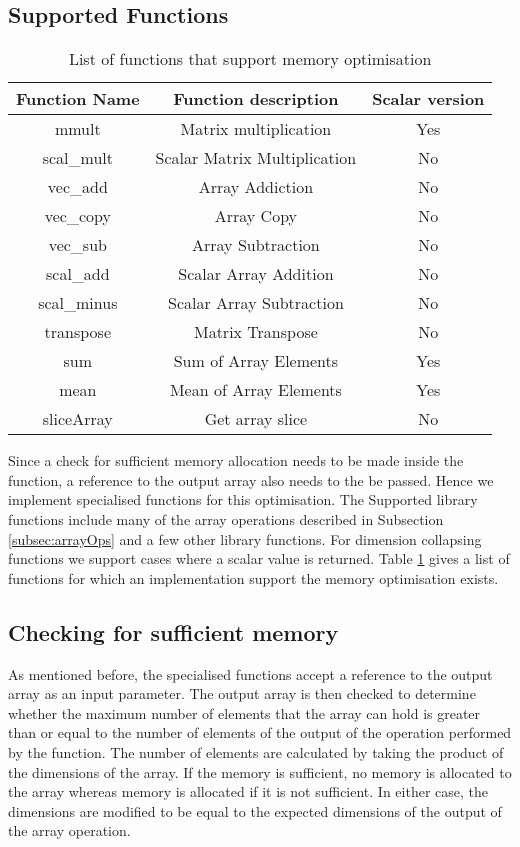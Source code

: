 \subsection{Supported Functions}
\begin{table}[htbp]
\centering
\begin{tabular}{|c|c|c|}
\hline
Function Name & Function description         & Scalar version \\ \hline
mmult         & Matrix multiplication        & Yes            \\ \hline
scal\_mult    & Scalar Matrix Multiplication & No             \\ \hline
vec\_add      & Array Addiction              & No             \\ \hline
vec\_copy     & Array Copy                   & No             \\ \hline
vec\_sub      & Array Subtraction            & No             \\ \hline
scal\_add     & Scalar Array Addition        & No             \\ \hline
scal\_minus   & Scalar Array Subtraction     & No             \\ \hline
transpose     & Matrix Transpose             & No             \\ \hline
sum           & Sum of Array Elements        & Yes            \\ \hline
mean          & Mean of Array Elements       & Yes            \\ \hline
sliceArray          & Get array slice        & No            \\ \hline
\end{tabular}
\caption{List of functions that support memory optimisation}
\label{tab:memoptimiselist}
\end{table}
Since a check for sufficient memory allocation needs to be made inside the function, a reference to the output array also needs to the be passed. Hence we implement specialised functions for this optimisation. The Supported library functions include many of the  array operations described in Subsection \ref{subsec:arrayOps} and a few other library functions. For dimension collapsing functions we support cases where a scalar value is returned. Table \ref{tab:memoptimiselist} gives a list of functions for which an implementation support the memory optimisation exists. 
\subsection{Checking for sufficient memory}
As mentioned before, the specialised functions accept a reference to the output array as an input parameter. The output array is then checked to determine whether the maximum number of elements that the array can hold is greater than or equal to the number of elements of the output of the operation performed by the function. The number of elements are calculated by taking the product of the dimensions of the array. If the memory is sufficient, no memory is allocated to the array whereas memory is allocated if it is not sufficient. In either case, the dimensions are modified to be equal to the expected dimensions of the output of the array operation.   
